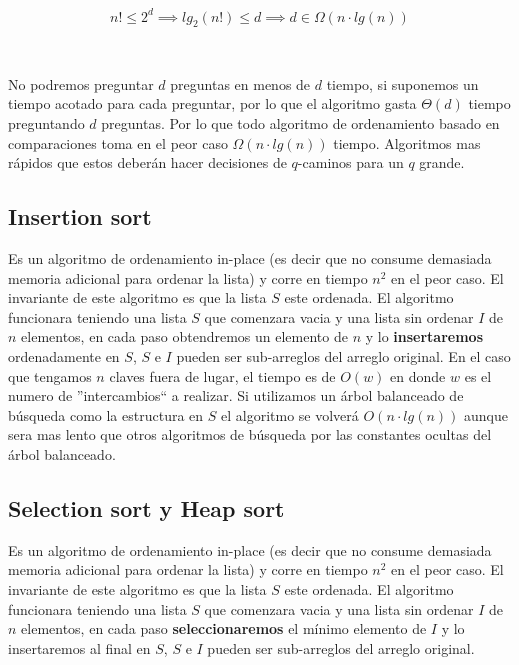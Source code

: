 \begin{equation*}
 n! \leq 2^d \implies lg_2(n!) \leq d \implies d \in \Omega(n \cdot lg(n))
\end{equation*}

~

No podremos preguntar $d$ preguntas en menos de $d$ tiempo, si suponemos un tiempo acotado para cada preguntar, por lo que el algoritmo gasta $\Theta(d)$ tiempo preguntando $d$ preguntas. Por lo que todo algoritmo de ordenamiento basado en comparaciones toma en el peor caso $\Omega(n \cdot lg(n))$ tiempo. Algoritmos mas r\'apidos que estos deber\'an hacer decisiones de $q$-caminos para un $q$ grande.

\subsection{Insertion sort}

Es un algoritmo de ordenamiento in-place (es decir que no consume demasiada memoria adicional para ordenar la lista) y corre en tiempo $n^2$ en el peor caso. El invariante de este algoritmo es que la lista $S$ este ordenada. El algoritmo funcionara teniendo una lista $S$ que comenzara vacia y una lista sin ordenar $I$ de $n$ elementos, en cada paso obtendremos un elemento de $n$ y lo \textbf{insertaremos} ordenadamente en $S$, $S$ e $I$ pueden ser sub-arreglos del arreglo original. En el caso que tengamos $n$ claves fuera de lugar, el tiempo es de $O(w)$ en donde $w$ es el numero de ''intercambios`` a realizar. Si utilizamos un \'arbol balanceado de b\'usqueda como la estructura en $S$ el algoritmo se volver\'a $O(n\cdot lg(n))$ aunque sera mas lento que otros algoritmos de b\'usqueda por las constantes ocultas del \'arbol balanceado.

\subsection{Selection sort y Heap sort}

Es un algoritmo de ordenamiento in-place (es decir que no consume demasiada memoria adicional para ordenar la lista) y corre en tiempo $n^2$ en el peor caso. El invariante de este algoritmo es que la lista $S$ este ordenada. El algoritmo funcionara teniendo una lista $S$ que comenzara vacia y una lista sin ordenar $I$ de $n$ elementos, en cada paso \textbf{seleccionaremos} el m\'inimo elemento de $I$ y lo insertaremos al final en $S$, $S$ e $I$ pueden ser sub-arreglos del arreglo original.

